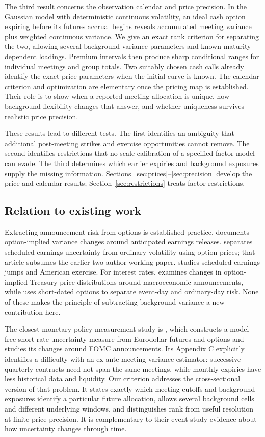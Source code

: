 The third result concerns the observation calendar and price precision. In the Gaussian model with deterministic continuous volatility, an ideal cash option expiring before its futures accrual begins reveals accumulated meeting variance plus weighted continuous variance. We give an exact rank criterion for separating the two, allowing several background-variance parameters and known maturity-dependent loadings. Premium intervals then produce sharp conditional ranges for individual meetings and group totals. Two suitably chosen cash calls already identify the exact price parameters when the initial curve is known. The calendar criterion and optimization are elementary once the pricing map is established. Their role is to show when a reported meeting allocation is unique, how background flexibility changes that answer, and whether uniqueness survives realistic price precision.

These results lead to different tests. The first identifies an ambiguity that additional post-meeting strikes and exercise opportunities cannot remove. The second identifies restrictions that no scale calibration of a specified factor model can evade. The third determines which earlier expiries and background exposures supply the missing information. Sections~\ref{sec:prices}--\ref{sec:precision} develop the price and calendar results; Section~\ref{sec:restrictions} treats factor restrictions.

\subsection{Relation to existing work}
Extracting announcement risk from options is established practice. \citet{patell1979anticipated} documents option-implied variance changes around anticipated earnings releases. \citet{dubinsky2018option} separates scheduled earnings uncertainty from ordinary volatility using option prices; that article subsumes the earlier two-author working paper. \citet{leung2014accounting} studies scheduled earnings jumps and American exercise. For interest rates, \citet{beber2006effect} examines changes in option-implied Treasury-price distributions around macroeconomic announcements, while \citet{wright2020event} uses short-dated options to separate event-day and ordinary-day risk. None of these makes the principle of subtracting background variance a new contribution here.

The closest monetary-policy measurement study is \citet{bauer2021market}, which constructs a model-free short-rate uncertainty measure from Eurodollar futures and options and studies its changes around FOMC announcements. Its Appendix C explicitly identifies a difficulty with an ex ante meeting-variance estimator: successive quarterly contracts need not span the same meetings, while monthly expiries have less historical data and liquidity. Our criterion addresses the cross-sectional version of that problem. It states exactly which meeting cutoffs and background exposures identify a particular future allocation, allows several background cells and different underlying windows, and distinguishes rank from useful resolution at finite price precision. It is complementary to their event-study evidence about how uncertainty changes through time.

